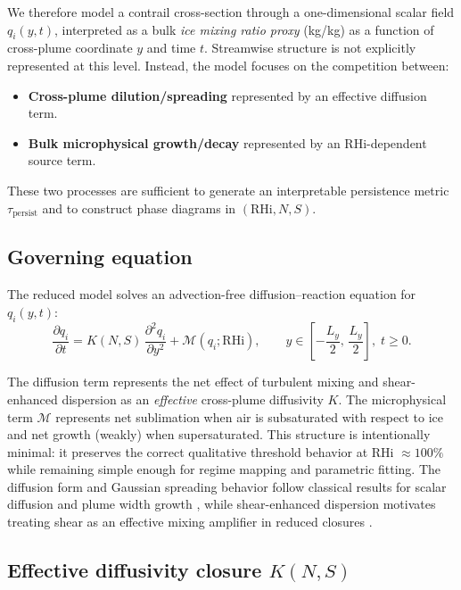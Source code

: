 \documentclass[11pt]{article}
\begin{document}
We therefore model a contrail cross-section through a one-dimensional scalar field
$q_i(y,t)$, interpreted as a bulk \emph{ice mixing ratio proxy} (\si{kg/kg}) as a function of
cross-plume coordinate $y$ and time $t$. Streamwise structure is not explicitly represented
at this level. Instead, the model focuses on the competition between:
\begin{itemize}
    \item \textbf{Cross-plume dilution/spreading} represented by an effective diffusion term.
    \item \textbf{Bulk microphysical growth/decay} represented by an RHi-dependent source term.
\end{itemize}
These two processes are sufficient to generate an interpretable persistence metric
$\tau_{\mathrm{persist}}$ and to construct phase diagrams in $(\mathrm{RHi},N,S)$.

\subsection{Governing equation}
\label{sec:matlab_pde}

The reduced model solves an advection-free diffusion--reaction equation for $q_i(y,t)$:
\begin{equation}
\frac{\partial q_i}{\partial t}
=
K(N,S)\,\frac{\partial^2 q_i}{\partial y^2}
+\mathcal{M}\!\left(q_i;\mathrm{RHi}\right),
\qquad y\in\left[-\frac{L_y}{2},\,\frac{L_y}{2}\right], \; t\ge 0.
\label{eq:pde}
\end{equation}

The diffusion term represents the net effect of turbulent mixing and shear-enhanced dispersion
as an \emph{effective} cross-plume diffusivity $K$.
The microphysical term $\mathcal{M}$ represents net sublimation when air is subsaturated with
respect to ice and net growth (weakly) when supersaturated. This structure is intentionally
minimal: it preserves the correct qualitative threshold behavior at RHi $\approx 100\%$ while
remaining simple enough for regime mapping and parametric fitting. The diffusion form and Gaussian spreading behavior follow classical results for scalar diffusion
and plume width growth \cite{Taylor1921,Fischer1979}, while shear-enhanced dispersion motivates treating
shear as an effective mixing amplifier in reduced closures \cite{Taylor1953}.


\subsection{Effective diffusivity closure $K(N,S)$}
\label{sec:matlab_K}
\end{document}
